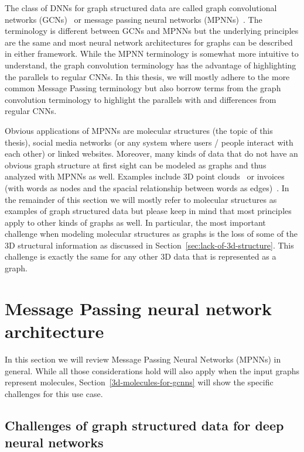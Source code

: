 The class of DNNs for graph structured data are called graph convolutional networks (GCNs)~\cite{Kipf2017} or message passing neural networks (MPNNs)~\cite{Gilmer2017}. The terminology is different between GCNs and MPNNs but the underlying principles are the same and most neural network architectures for graphs can be described in either framework. While the MPNN terminology is somewhat more intuitive to understand, the graph convolution terminology has the advantage of highlighting the parallels to regular CNNs. In this thesis, we will mostly adhere to the more common Message Passing terminology but also borrow terms from the graph convolution terminology to highlight the parallels with and differences from regular CNNs.

Obvious applications of MPNNs are molecular structures (the topic of this thesis), social media networks (or any system where users / people interact with each other) or linked websites. Moreover, many kinds of data that do not have an obvious graph structure at first sight can be modeled as graphs and thus analyzed with MPNNs as well. Examples include 3D point clouds~\cite{Charles2017} or invoices (with words as nodes and the spacial relationship between words as edges)~\cite{Riba2019}.
In the remainder of this section we will mostly refer to molecular structures as examples of graph structured data but please keep in mind that most principles apply to other kinds of graphs as well. In particular, the most important challenge when modeling molecular structures as graphs is the loss of some of the 3D structural information as discussed in Section~\ref{sec:lack-of-3d-structure}. This challenge is exactly the same for any other 3D data that is represented as a graph.

\section{Message Passing neural network architecture}

In this section we will review Message Passing Neural Networks (MPNNs) in general. While all those considerations hold will also apply when the input graphs represent molecules, Section~\ref{3d-molecules-for-gcnns} will show the specific challenges for this use case.

\subsection{Challenges of graph structured data for deep neural networks}
\label{sec:graph-challenges}

